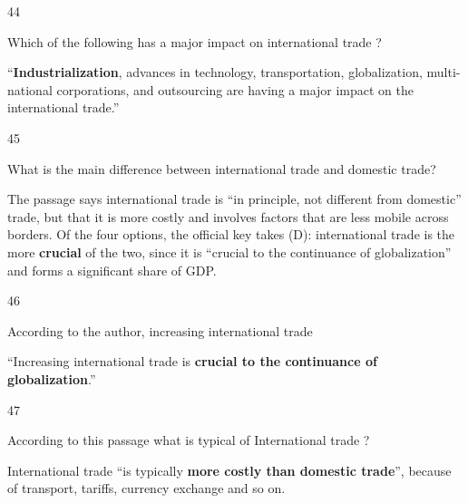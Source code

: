 \begin{question}{44}
{Which of the following has a major impact on international trade ?\par}
\begin{explain}
``\textbf{Industrialization}, advances in technology, transportation, globalization, multi-national corporations, and outsourcing are having a major impact on the international trade.''
\end{explain}
\end{question}

\begin{question}{45}
{What is the main difference between international trade and domestic trade?\par}
\begin{explain}
The passage says international trade is ``in principle, not different from domestic'' trade, but that it is more costly and involves factors that are less mobile across borders. Of the four options, the official key takes (D): international trade is the more \textbf{crucial} of the two, since it is ``crucial to the continuance of globalization'' and forms a significant share of GDP.
\end{explain}
\end{question}

\begin{question}{46}
{According to the author, increasing international trade\par}
\begin{explain}
``Increasing international trade is \textbf{crucial to the continuance of globalization}.''
\end{explain}
\end{question}

\begin{question}{47}
{According to this passage what is typical of International trade ?\par}
\begin{explain}
International trade ``is typically \textbf{more costly than domestic trade}'', because of transport, tariffs, currency exchange and so on.
\end{explain}
\end{question}

